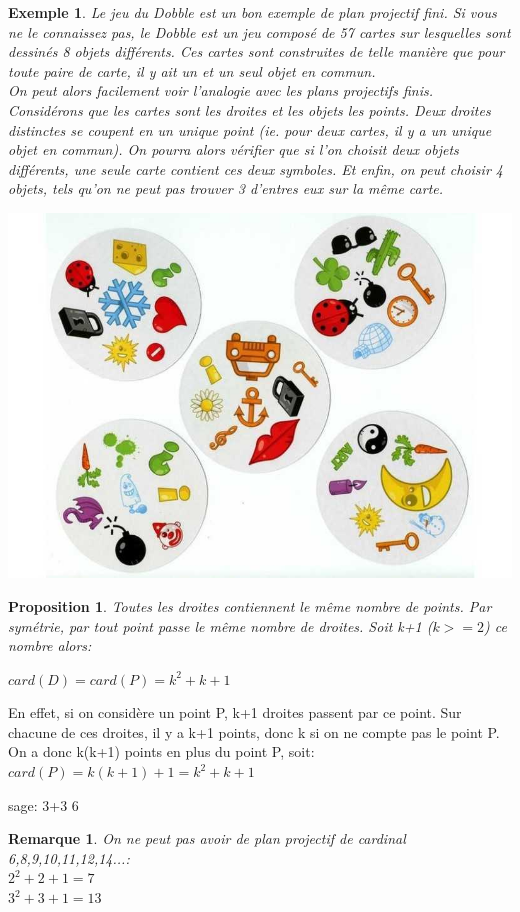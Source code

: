 \documentclass[a4paper]{article}
\newtheorem{Rem}{Remarque}[subsection]
\newtheorem{Ex}{Exemple}[subsection]
\newtheorem{Prop}{Proposition}
\begin{document}
\begin{Ex}
Le jeu du Dobble est un bon exemple de plan projectif fini. Si vous ne le connaissez pas, le Dobble est un jeu composé de 57 cartes sur lesquelles sont dessinés 8 objets différents. Ces cartes sont construites de telle manière que pour toute paire de carte, il y ait un et un seul objet en commun. \\
On peut alors facilement voir l'analogie avec les plans projectifs finis. Considérons que les cartes sont les droites et les objets les points. Deux droites distinctes se coupent en un unique point (ie. pour deux cartes, il y a un unique objet en commun). On pourra alors vérifier que si l'on choisit deux objets différents, une seule carte contient ces deux symboles. Et enfin, on peut choisir 4 objets, tels qu'on ne peut pas trouver 3 d'entres eux sur la même carte.
\begin{center}
\includegraphics[scale=0.3]{dobble-2.jpg}
\end{center}
\end{Ex}
\begin{Prop}
Toutes les droites contiennent le même nombre de points. Par symétrie, par tout point passe le même nombre de droites. Soit k+1 ($k>=2$) ce nombre alors:
\begin{center}
$card(D)=card(P)=k^2+k+1$
\end{center}
\end{Prop}
En effet, si on considère un point P, k+1 droites passent par ce point. Sur chacune de ces droites, il y a k+1 points, donc k si on ne compte pas le point P. On a donc k(k+1) points en plus du point P, soit:	$card(P)=k(k+1)+1=k^2+k+1$
\begin{sageverbatim}
  sage: 3+3
  6
\end{sageverbatim}
\begin{Rem}
On ne peut pas avoir de plan projectif de cardinal 6,8,9,10,11,12,14...: \\
$2^2+2+1=7$ \\
$3^2+3+1=13$
\end{Rem}
\end{document}
